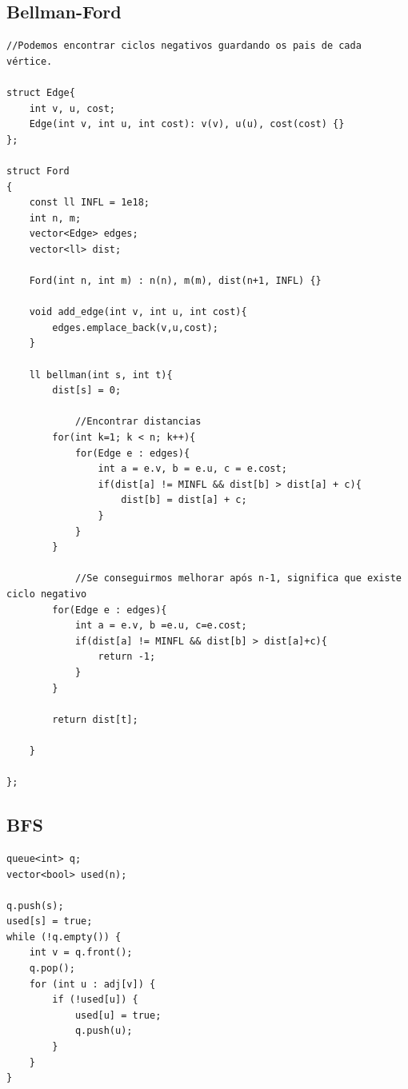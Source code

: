 \documentclass[11pt, a4paper, twoside]{article}
\begin{document}
\subsection{Bellman-Ford}
\begin{verbatim}
//Podemos encontrar ciclos negativos guardando os pais de cada vértice.

struct Edge{
    int v, u, cost;
    Edge(int v, int u, int cost): v(v), u(u), cost(cost) {}
};

struct Ford
{   
    const ll INFL = 1e18;
    int n, m;
    vector<Edge> edges;
    vector<ll> dist;
    
    Ford(int n, int m) : n(n), m(m), dist(n+1, INFL) {}
    
    void add_edge(int v, int u, int cost){
        edges.emplace_back(v,u,cost);
    }
    
    ll bellman(int s, int t){
        dist[s] = 0;
    
            //Encontrar distancias
        for(int k=1; k < n; k++){
            for(Edge e : edges){
                int a = e.v, b = e.u, c = e.cost;
                if(dist[a] != MINFL && dist[b] > dist[a] + c){
                    dist[b] = dist[a] + c;
                }
            }
        }
    
            //Se conseguirmos melhorar após n-1, significa que existe ciclo negativo
        for(Edge e : edges){
            int a = e.v, b =e.u, c=e.cost;
            if(dist[a] != MINFL && dist[b] > dist[a]+c){
                return -1;
            }
        }
    
        return dist[t];
            
    }
    
};
\end{verbatim}

\subsection{BFS}
\begin{verbatim}
queue<int> q;
vector<bool> used(n);

q.push(s);
used[s] = true;
while (!q.empty()) {
    int v = q.front();
    q.pop();
    for (int u : adj[v]) {
        if (!used[u]) {
            used[u] = true;
            q.push(u);
        }
    }
}
\end{verbatim}
\end{document}
